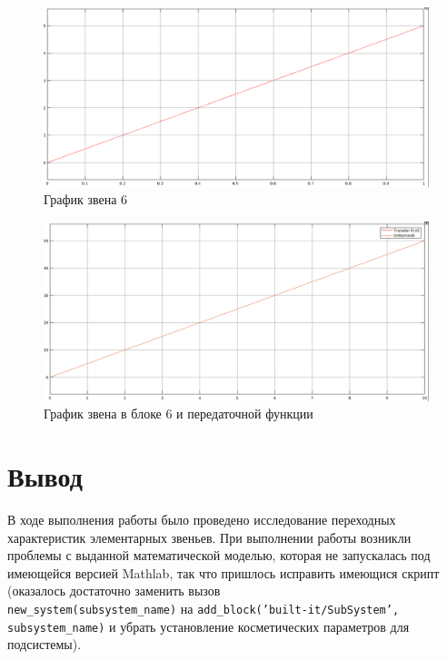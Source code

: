 \documentclass[12pt, a4paper] {ncc}
\begin{document}
    	\begin{figure}[ht!]
    		\includegraphics[scale=0.3]{./plot6.png}
			\caption{График звена 6}
			\label{fig:p6}
    	\end{figure}
    	\begin{figure}[ht!]
    		\includegraphics[scale=0.3]{./plot_both6.png}
			\caption{График звена в блоке 6 и передаточной функции}
			\label{fig:pb6}
    	\end{figure}

\section{Вывод}

В ходе выполнения работы было проведено исследование переходных характеристик
элементарных звеньев. При выполнении работы возникли проблемы с выданной
математической моделью, которая не запускалась под имеющейся версией Mathlab,
так что пришлось исправить имеющися скрипт (оказалось достаточно
заменить вызов \\ \texttt{new\_system(subsystem\_name)} на \texttt{add\_block('built-it/SubSystem', subsystem\_name)}
и убрать установление косметических параметров для подсистемы).
\end{document}
